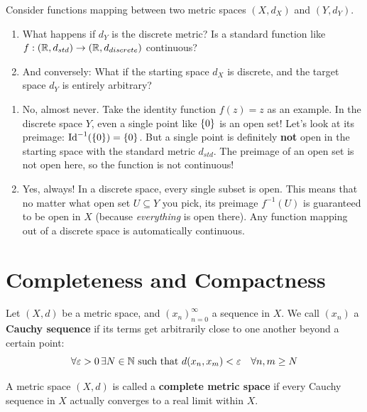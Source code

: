 \vspace{0.5cm}

\begin{question*}
Consider functions mapping between two metric spaces $(X, d_X)$ and $(Y, d_Y)$.
\begin{enumerate}
    \item What happens if $d_Y$ is the discrete metric? Is a standard function like $f: (\mathbb{R}, d_{std}) \to (\mathbb{R}, d_{discrete})$ continuous?
    \item And conversely: What if the starting space $d_X$ is discrete, and the target space $d_Y$ is entirely arbitrary?
\end{enumerate}
\end{question*}

\begin{answer*}
\begin{enumerate}
    \item \textcolor{eDarkRed}{No, almost never.} Take the identity function $f(z) = z$ as an example. In the discrete space $Y$, even a single point like $\left\{ 0 \right\}$ is an open set! Let's look at its preimage: $\text{Id}^{-1}(\left\{ 0 \right\}) = \left\{ 0 \right\}$. But a single point is definitely \textbf{not} open in the starting space with the standard metric $d_{std}$. The preimage of an open set is not open here, so the function is not continuous!
    
    \item \textcolor{eDarkGreen}{Yes, always!} In a discrete space, every single subset is open. This means that no matter what open set $U \subseteq Y$ you pick, its preimage $f^{-1}(U)$ is guaranteed to be open in $X$ (because \emph{everything} is open there). Any function mapping out of a discrete space is automatically continuous.
\end{enumerate}
\end{answer*}

\hrulefill

\section{Completeness and Compactness}

\begin{definition*}
Let $(X, d)$ be a metric space, and $(x_n)_{n=0}^\infty$ a sequence in $X$. We call $(x_n)$ a \textcolor{eDarkGreen}{\textbf{Cauchy sequence}} if its terms get arbitrarily close to one another beyond a certain point:
\[ \forall \varepsilon > 0 \, \exists N \in \mathbb{N} \text{ such that } d(x_n, x_m) < \varepsilon \quad \forall n, m \ge N \]

A metric space $(X, d)$ is called a \textcolor{eDarkGreen}{\textbf{complete metric space}} if every Cauchy sequence in $X$ actually converges to a real limit within $X$.
\end{definition*}

